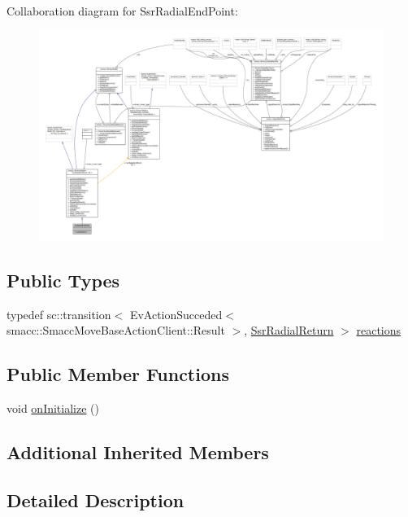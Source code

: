 Collaboration diagram for Ssr\+Radial\+End\+Point\+:
\nopagebreak
\begin{figure}[H]
\begin{center}
\leavevmode
\includegraphics[width=350pt]{structSsrRadialEndPoint__coll__graph}
\end{center}
\end{figure}
\subsection*{Public Types}
\begin{DoxyCompactItemize}
\item 
typedef sc\+::transition$<$ Ev\+Action\+Succeded$<$ smacc\+::\+Smacc\+Move\+Base\+Action\+Client\+::\+Result $>$, \hyperlink{structSsrRadialReturn}{Ssr\+Radial\+Return} $>$ \hyperlink{structSsrRadialEndPoint_a4f85890b7995fbc7a3f42dfd6bf0582d}{reactions}
\end{DoxyCompactItemize}
\subsection*{Public Member Functions}
\begin{DoxyCompactItemize}
\item 
void \hyperlink{structSsrRadialEndPoint_a193b193a7a831dcdf586686c0c309f73}{on\+Initialize} ()
\end{DoxyCompactItemize}
\subsection*{Additional Inherited Members}


\subsection{Detailed Description}


